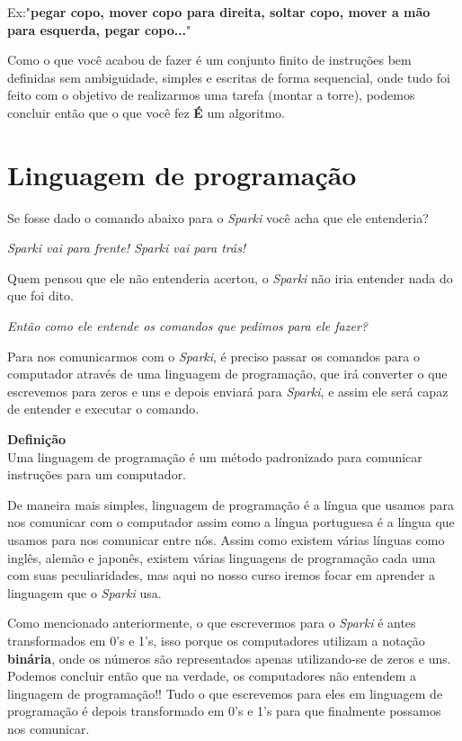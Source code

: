 Ex:"\textbf{pegar copo, mover copo para direita, soltar copo, mover a mão para esquerda, pegar copo...}"

Como o que você acabou de fazer é um conjunto finito de instruções bem definidas sem ambiguidade, simples e escritas de forma sequencial, onde tudo foi feito com o objetivo de realizarmos uma tarefa (montar a torre), podemos concluir então que o que você fez \textbf{É} um algoritmo.




\section{Linguagem de programação}
    Se fosse dado o comando abaixo para o \textit{Sparki} você acha que ele entenderia? \par
    \begin{center}
    \textit{Sparki vai para frente! Sparki vai para trás!}\ \par
    \end{center} \par
    Quem pensou que ele não entenderia acertou, o \textit{Sparki} não iria entender nada do que foi dito. \par
    \textit{Então como ele entende os comandos que pedimos para ele fazer?}\par
    Para nos comunicarmos com o \textit{Sparki}, é preciso passar os comandos para o computador através de uma linguagem de programação, que irá converter o que escrevemos para zeros e uns e depois enviará para \textit{Sparki}, e assim ele será capaz de entender e executar o comando.
    
    \begin{center}
    \textbf{Definição} \\
    Uma linguagem de programação é um método padronizado para comunicar instruções para um computador.
    \end{center} \par
    
De maneira mais simples, linguagem de programação é a língua que usamos para nos comunicar com o computador assim como a língua portuguesa é a língua que usamos para nos comunicar entre nós. Assim como existem várias línguas como inglês, alemão e japonês, existem várias linguagens de programação cada uma com suas peculiaridades, mas aqui no nosso curso iremos focar em aprender a linguagem que o \textit{Sparki} usa.

Como mencionado anteriormente, o que escrevermos para o \textit{Sparki} é antes transformados em 0's e 1's, isso porque os computadores utilizam a notação \textbf{binária}, onde os números são representados apenas utilizando-se de zeros e uns. Podemos concluir então que na verdade, os computadores não entendem a linguagem de programação!! Tudo o que escrevemos para eles em linguagem de programação é depois transformado em 0's e 1's para que finalmente possamos nos comunicar.
    

